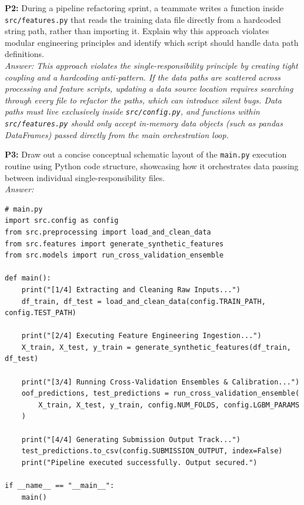 \documentclass{article}
\begin{document}
\newline
\textbf{P2:} During a pipeline refactoring sprint, a teammate writes a function inside \texttt{src/features.py} that reads the training data file directly from a hardcoded string path, rather than importing it. Explain why this approach violates modular engineering principles and identify which script should handle data path definitions.
\\
\textit{Answer: This approach violates the single-responsibility principle by creating tight coupling and a hardcoding anti-pattern. If the data paths are scattered across processing and feature scripts, updating a data source location requires searching through every file to refactor the paths, which can introduce silent bugs. Data paths must live exclusively inside \texttt{src/config.py}, and functions within \texttt{src/features.py} should only accept in-memory data objects (such as pandas DataFrames) passed directly from the main orchestration loop.}

\newline
\textbf{P3:} Draw out a concise conceptual schematic layout of the \texttt{main.py} execution routine using Python code structure, showcasing how it orchestrates data passing between individual single-responsibility files.
\\
\textit{Answer:}
\begin{verbatim}
# main.py
import src.config as config
from src.preprocessing import load_and_clean_data
from src.features import generate_synthetic_features
from src.models import run_cross_validation_ensemble

def main():
    print("[1/4] Extracting and Cleaning Raw Inputs...")
    df_train, df_test = load_and_clean_data(config.TRAIN_PATH, config.TEST_PATH)

    print("[2/4] Executing Feature Engineering Ingestion...")
    X_train, X_test, y_train = generate_synthetic_features(df_train, df_test)

    print("[3/4] Running Cross-Validation Ensembles & Calibration...")
    oof_predictions, test_predictions = run_cross_validation_ensemble(
        X_train, X_test, y_train, config.NUM_FOLDS, config.LGBM_PARAMS
    )

    print("[4/4] Generating Submission Output Track...")
    test_predictions.to_csv(config.SUBMISSION_OUTPUT, index=False)
    print("Pipeline executed successfully. Output secured.")

if __name__ == "__main__":
    main()
\end{verbatim}
\end{document}
